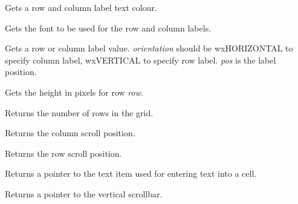 Gets a row and column label text colour.

\label{wxgridgetlabeltextfont}


Gets the font to be used for the row and column labels.

\label{wxgridgetlabelvalue}


Gets a row or column label value. {\it orientation} should
be wxHORIZONTAL to specify column label, wxVERTICAL to specify row label.\rtfsp
{\it pos} is the label position.

\label{wxgridgetrowheight}


Gets the height in pixels for row {\it row}.

\label{wxgridgetrows}


Returns the number of rows in the grid.

\label{wxgridgetscrollposx}


Returns the column scroll position.

\label{wxgridgetscrollposy}


Returns the row scroll position.

\label{wxgridgettextitem}


Returns a pointer to the text item used for entering text into a cell.

\label{wxgridgetvertscrollbar}


Returns a pointer to the vertical scrollbar.

\label{wxgridinsertcols}



